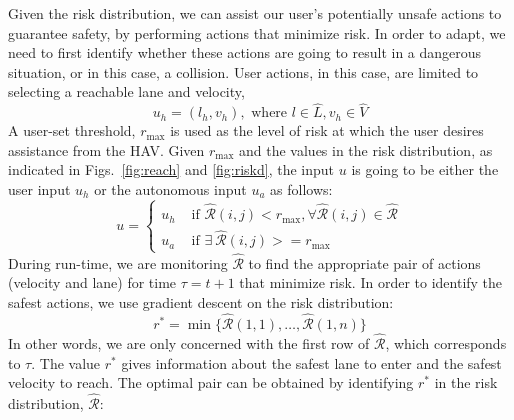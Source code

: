 \documentclass[letterpaper, 10 pt, conference]{ieeeconf}  %
\newcommand\NB[1]{$\spadesuit$\footnote{NB: #1}}
\begin{document}
Given the risk distribution, we can assist our user's potentially unsafe actions to guarantee safety, by performing actions that minimize risk. In order to adapt, we need to first identify whether these actions are going to result in a dangerous situation, or in this case, a collision. User actions, in this case, are limited to selecting a reachable lane and velocity,
\begin{equation}
u_h = (l_h,v_h), \text{ where } l\in\hat{L}, v_h\in\hat{V}
\end{equation}
A user-set threshold, $r_\max$ is used as the level of risk at which the user desires assistance from the HAV. Given $r_\max$ and the values in the risk distribution, as indicated in Figs.~\ref{fig:reach} and \ref{fig:riskd}, the input $u$ is going to be either the user input $u_h$ or the autonomous input $u_a$ as follows:
\begin{equation} \label{eq:inputctrl}
    u = \begin{cases}
    u_h & \text{ if } \hat{\mathcal{R}}(i,j) < r_\max, \forall\hat{\mathcal{R}}(i,j)\in\hat{\mathcal{R}} \\
    u_a & \text{ if } \exists~\hat{\mathcal{R}}(i,j) >= r_\max
    \end{cases}
\end{equation}
During run-time, we are monitoring $\hat{\mathcal{R}}$ to find the appropriate pair of actions (velocity and lane) for time $\tau = t+1$ that minimize risk. In order to identify the safest actions, we use gradient descent on the risk distribution:
\begin{equation} \label{eq:optpt}
  r^* = \min\{\hat{\mathcal{R}}(1,1),\ldots,\hat{\mathcal{R}}(1,n)\}  
\end{equation}
In other words, we are only concerned with the first row of $\hat{\mathcal{R}}$, which corresponds to $\tau$.
The value $r^*$ gives information about the safest lane to enter and the safest velocity to reach. The optimal pair can be obtained by identifying $r^*$ in the risk distribution, $\hat{\mathcal{R}}$:
\end{document}

